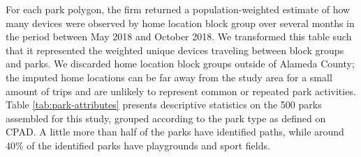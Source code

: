 \documentclass[3p, authoryear, review]{elsarticle} %
\begin{document}
For each park polygon, the firm returned a population-weighted estimate of how
many devices were observed by home location block group over several months in
the period between May 2018 and October 2018. We transformed this table such
that it represented the weighted unique devices traveling between block groups
and parks. We discarded home location block groups outside of Alameda County;
the imputed home locations can be far away from the study area for a small
amount of trips and are unlikely to represent common or repeated park
activities. Table \ref{tab:park-attributes} presents descriptive statistics on
the 500 parks assembled for this study, grouped according to the
park type as defined on CPAD. A little more than half of the parks have
identified paths, while around 40\% of the identified parks have playgrounds and
sport fields.
\end{document}
